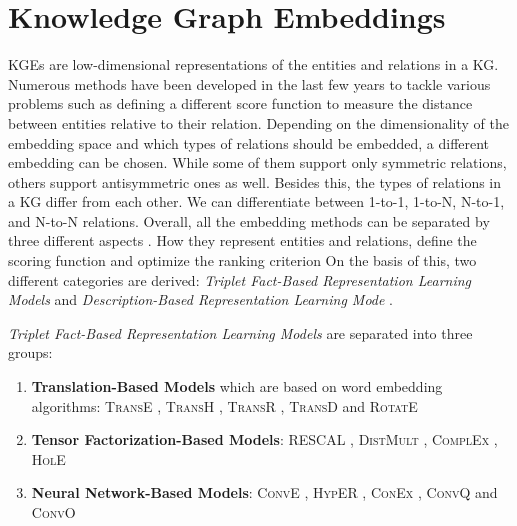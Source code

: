 \section{Knowledge Graph Embeddings} 
\acp{KGE} are low-dimensional representations of the entities and relations in a \ac{KG}. 
Numerous methods have been developed in the last few years to tackle various problems such as defining a different score function to measure the distance between entities relative to their relation.
Depending on the dimensionality of the embedding space and which types of relations should be embedded, a different embedding can be chosen.
While some of them support only symmetric relations, others support antisymmetric ones as well. 
Besides this, the types of relations in a \ac{KG} differ from each other.
We can differentiate between 1-to-1, 1-to-N, N-to-1, and N-to-N relations.
Overall, all the embedding methods can be separated by three different aspects \cite{electronics9050750}.
How they represent entities and relations, define the scoring function and optimize the ranking criterion
On the basis of this, two different categories are derived:
\textit{Triplet Fact-Based Representation Learning Models} and \textit{Description-Based Representation Learning Mode} \cite{electronics9050750}.

\textit{Triplet Fact-Based Representation Learning Models} are separated into three groups:
\begin{enumerate}
    \item 
    \textbf{Translation-Based Models}  which are based on word embedding algorithms: 
    \textsc{TransE} \cite{TransE}, \textsc{TransH} \cite{TransH}, \textsc{TransR} \cite{TransR}, \textsc{TransD} \cite{TransD}
    and 
    \textsc{RotatE} \cite{RotatE}
    
    \item 
    \textbf{Tensor Factorization-Based Models}:
    \textsc{RESCAL} \cite{RESCAL}, \textsc{DistMult} \cite{DistMult}, \textsc{ComplEx} \cite{ComplEx}, \textsc{HolE} \cite{HolE}
    
    \item 
    \textbf{Neural Network-Based Models}:
    \textsc{ConvE} \cite{ConvE}, \textsc{HypER} \cite{HypER}, \textsc{ConEx} \cite{ConEx}, \textsc{ConvQ} and  \textsc{ConvO} \cite{demir2021convolutional}
\end{enumerate}

